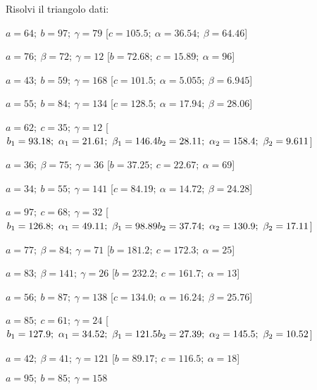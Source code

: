 

\begin{esercizio}\label{ese:}
 Risolvi il triangolo dati:
 \begin{enumeratea}
  \item  \(a=64;~b=97;~\gamma=79\)
   \hfill [\(c=105.5;~\alpha=36.54;~\beta=64.46\)]
  \item  \(a=76;~\beta=72;~\gamma=12\)
   \hfill [\(b=72.68;~c=15.89;~\alpha=96\)]
  \item  \(a=43;~b=59;~\gamma=168\)
   \hfill [\(c=101.5;~\alpha=5.055;~\beta=6.945\)]
  \item  \(a=55;~b=84;~\gamma=134\)
   \hfill [\(c=128.5;~\alpha=17.94;~\beta=28.06\)]
  \item  \(a=62;~c=35;~\gamma=12\)
   \hfill [\(b_1=93.18;~\alpha_1=21.61;~\beta_1=146.4 \\
   {} \hfill          b_2=28.11;~\alpha_2=158.4;~\beta_2=9.611\)]
  \item  \(a=36;~\beta=75;~\gamma=36\)
   \hfill [\(b=37.25;~c=22.67;~\alpha=69\)]
  \item  \(a=34;~b=55;~\gamma=141\)
   \hfill [\(c=84.19;~\alpha=14.72;~\beta=24.28\)]
  \item  \(a=97;~c=68;~\gamma=32\)
   \hfill [\(b_1=126.8;~\alpha_1=49.11;~\beta_1=98.89 \\
   {} \hfill          b_2=37.74;~\alpha_2=130.9;~\beta_2=17.11\)]
  \item  \(a=77;~\beta=84;~\gamma=71\)
   \hfill [\(b=181.2;~c=172.3;~\alpha=25\)]
  \item  \(a=83;~\beta=141;~\gamma=26\)
   \hfill [\(b=232.2;~c=161.7;~\alpha=13\)]
  \item  \(a=56;~b=87;~\gamma=138\)
   \hfill [\(c=134.0;~\alpha=16.24;~\beta=25.76\)]
  \item  \(a=85;~c=61;~\gamma=24\)
   \hfill [\(b_1=127.9;~\alpha_1=34.52;~\beta_1=121.5 \\
   {} \hfill          b_2=27.39;~\alpha_2=145.5;~\beta_2=10.52\)]
  \item  \(a=42;~\beta=41;~\gamma=121\)
   \hfill [\(b=89.17;~c=116.5;~\alpha=18\)]
  \item  \(a=95;~b=85;~\gamma=158\)

\end{enumeratea}
\end{esercizio}
